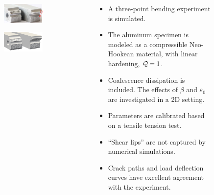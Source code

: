 \begin{frame}
\begin{columns}[T]
\begin{column}{0.6\textwidth}
\begin{figure}
        \begin{subfigure}[b]{0.45\textwidth}
          \centering
          \includegraphics[width=0.9\textwidth,scale=0.5]{examples/figures/split_experiment}
        \end{subfigure}
        \begin{subfigure}[b]{0.45\textwidth}
          \centering
          \includegraphics[width=0.9\textwidth,scale=0.5]{examples/figures/split}
        \end{subfigure}
      \end{figure}
    \end{column}
    \begin{column}{0.4\textwidth}
      \begin{itemize}
        \item A \textcolor{peggyblue}{three-point bending} experiment is simulated.
        \item The \textcolor{peggyblue}{aluminum} specimen is modeled as a \textcolor{peggyblue}{compressible Neo-Hookean} material, with \textcolor{peggyblue}{linear hardening}, \textcolor{peggyblue}{$\mathcal{Q} = 1$}.
        \item \textcolor{peggyblue}{Coalescence dissipation} is included. The effects of $\beta$ and $\varepsilon_0$ are investigated in a 2D setting.
        \item Parameters are calibrated based on a \textcolor{peggyblue}{tensile tension test}.
        \item ``Shear lips'' are not captured by numerical simulations.
        \item Crack paths and load deflection curves have \textcolor{peggyblue}{excellent agreement} with the experiment.
      \end{itemize}
    \end{column}
  \end{columns}
\end{frame}

